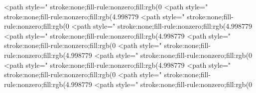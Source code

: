 <path style=" stroke:none;fill-rule:nonzero;fill:rgb(0%
<path style=" stroke:none;fill-rule:nonzero;fill:rgb(4.998779%
<path style=" stroke:none;fill-rule:nonzero;fill:rgb(0%
<path style=" stroke:none;fill-rule:nonzero;fill:rgb(4.998779%
<path style=" stroke:none;fill-rule:nonzero;fill:rgb(4.998779%
<path style=" stroke:none;fill-rule:nonzero;fill:rgb(0%
<path style=" stroke:none;fill-rule:nonzero;fill:rgb(4.998779%
<path style=" stroke:none;fill-rule:nonzero;fill:rgb(0%
<path style=" stroke:none;fill-rule:nonzero;fill:rgb(4.998779%
<path style=" stroke:none;fill-rule:nonzero;fill:rgb(0%
<path style=" stroke:none;fill-rule:nonzero;fill:rgb(4.998779%
<path style=" stroke:none;fill-rule:nonzero;fill:rgb(0%
